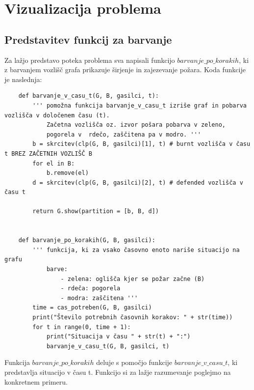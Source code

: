 \documentclass[a4paper, 12pt]{article}
\begin{document}

\section{Vizualizacija problema}

\subsection{Predstavitev funkcij za barvanje}

\noindent Za lažjo predstavo poteka problema sva napisali funkcijo $barvanje\_po\_korakih$, ki z barvanjem
vozlišč grafa prikazuje širjenje in zajezevanje požara. Koda funkcije je naslednja:

\begin{scriptsize}
\begin{verbatim}
    def barvanje_v_casu_t(G, B, gasilci, t):
        ''' pomožna funkcija barvanje_v_casu_t izriše graf in pobarva vozlišča v določenem času (t). 
            Začetna vozlišča oz. izvor pošara pobarva v zeleno, 
            pogorela v  rdečo, zaščitena pa v modro. '''
        b = skrcitev(clp(G, B, gasilci)[1], t) # burnt vozlišča v času t BREZ ZAČETNIH VOZLIŠČ B
        for el in B:
            b.remove(el)
        d = skrcitev(clp(G, B, gasilci)[2], t) # defended vozlišča v času t
        
        return G.show(partition = [b, B, d])


    def barvanje_po_korakih(G, B, gasilci):
        ''' funkcija, ki za vsako časovno enoto nariše situacijo na grafu
            barve:
                - zelena: oglišča kjer se požar začne (B)
                - rdeča: pogorela
                - modra: zaščitena '''
        time = cas_potreben(G, B, gasilci)
        print("Število potrebnih časovnih korakov: " + str(time))
        for t in range(0, time + 1):
            print("Situacija v času " + str(t) + ":")
            barvanje_v_casu_t(G, B, gasilci, t)\end{verbatim}
\end{scriptsize}

\noindent Funkcija $barvanje\_po\_korakih$ deluje s pomočjo funkcije $barvanje\_v\_casu\_t$, ki predstavlja
situacijo v času t. Funkcijo si za lažje razumevanje poglejmo na konkretnem primeru.
\end{document}

